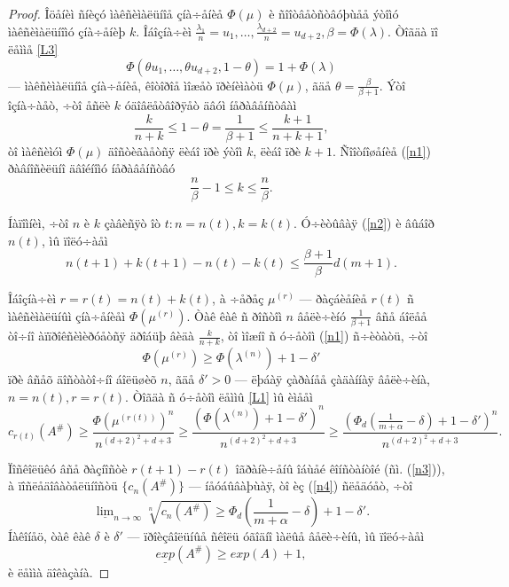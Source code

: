 \documentclass{article}
\numberwithin{equation}{section}
\theoremstyle{plain}
\theoremstyle{definition}
\newtheorem{proof}{Äîêàçàòåëüñòâî}
\begin{document}
\begin{fulltext}
\begin{proof}
Îöåíèì ñíèçó ìàêñèìàëüíîå çíà÷åíèå $\Phi(\mu)$ è ñîîòâåòñòâóþùåå ýòîìó ìàêñèìàëüíîìó çíà÷åíèþ $k$. Îáîçíà÷èì $\frac{\lambda_1}{n}=u_1,
\ldots,\frac{\lambda_{d+2}}{n}=u_{d+2}, \beta=\Phi(\lambda)$. Òîãäà ïî ëåììå \ref{L3}
\begin{equation}\label{n0}
\Phi\left(\theta u_1,\ldots,\theta u_{d+2},1-\theta\right)=1+\Phi(\lambda)
\end{equation}
--- ìàêñèìàëüíîå çíà÷åíèå, êîòîðîå ìîæåò ïðèíèìàòü $\Phi(\mu)$, ãäå $\theta=
\frac{\beta}{\beta+1}$. Ýòî îçíà÷àåò, ÷òî åñëè $k$ óäîâëåòâîðÿåò äâóì íåðàâåíñòâàì
\begin{equation}\label{n1}
\frac{k}{n+k}\le 1-\theta=\frac{1}{\beta+1}\le\frac{k+1}{n+k+1},
\end{equation}
òî ìàêñèìóì $\Phi(\mu)$ äîñòèãàåòñÿ ëèáî ïðè ýòîì $k$, ëèáî ïðè $k+1$. Ñîîòíîøåíèå (\ref{n1})
ðàâíîñèëüíî äâîéíîìó íåðàâåíñòâó
\begin{equation}\label{n2}
\frac{n}{\beta}-1\le k \le \frac{n}{\beta}.
\end{equation}

Íàïîìíèì, ÷òî $n$ è $k$ çàâèñÿò îò $t: n=n(t), k=k(t)$. Ó÷èòûâàÿ (\ref{n2}) è âûáîð $n(t)$, ìû ïîëó÷àåì
\begin{equation}\label{n3}
n(t+1)+k(t+1)-n(t)-k(t) \le\frac{\beta+1}{\beta} d(m+1).
\end{equation}

Îáîçíà÷èì $r=r(t)=n(t)+k(t)$, à ÷åðåç $\mu^{(r)}$ --- ðàçáèåíèå $r(t)$ ñ ìàêñèìàëüíûì
çíà÷åíèåì $\Phi(\mu^{(r)})$. Òàê êàê ñ ðîñòîì $n$ âåëè÷èíó $\frac{1}{\beta+1}$ âñå áîëåå
òî÷íî àïïðîêñèìèðóåòñÿ äðîáüþ âèäà $\frac{k}{n+k}$, òî ìîæíî ñ ó÷åòîì (\ref{n1}) ñ÷èòàòü, ÷òî
$$
\Phi(\mu^{(r)}) \ge \Phi(\lambda^{(n)})+1-\delta'
$$
ïðè âñåõ äîñòàòî÷íî áîëüøèõ $n$, ãäå $\delta' >0$ --- ëþáàÿ çàðàíåå çàäàííàÿ âåëè÷èíà,
$n=n(t), r=r(t)$. Òîãäà ñ ó÷åòîì ëåììû \ref{L1} ìû èìååì
\begin{equation}\label{n4}
c_{r(t)}(A^\#) \ge \frac{\Phi\left(\mu^{(r(t))} \right)^n }{n^{(d+2)^2+d+3}} 
\ge  \frac{\left(\Phi(\lambda^{(n)})+1-\delta' \right)^n}{n^{(d+2)^2+d+3}} \ge 
\frac{\left(\Phi_d(\frac{1}{m+\alpha}-\delta)+1-\delta' \right)^n}{n^{(d+2)^2+d+3}}.
\end{equation}

Ïîñêîëüêó âñå ðàçíîñòè $r(t+1)-r(t)$ îãðàíè÷åíû îáùåé êîíñòàíòîé (ñì. (\ref{n3})), à
ïîñëåäîâàòåëüíîñòü $\{c_n(A^\#)\}$ --- íåóáûâàþùàÿ, òî èç (\ref{n4}) ñëåäóåò, ÷òî
$$
\underline{\lim}_{n\to\infty}\sqrt[n]{c_n(A^\#)} \ge 
\Phi_d(\frac{1}{m+\alpha}-\delta)+1-\delta'.
$$
Íàêîíåö, òàê êàê $\delta$ è $\delta'$ --- ïðîèçâîëüíûå ñêîëü óãîäíî ìàëûå âåëè÷èíû, ìû ïîëó÷àåì
$$
\underline{exp}(A^\#) \ge exp(A)+1,
$$
è ëåììà äîêàçàíà.


\end{proof}
\end{fulltext}
\end{document}
